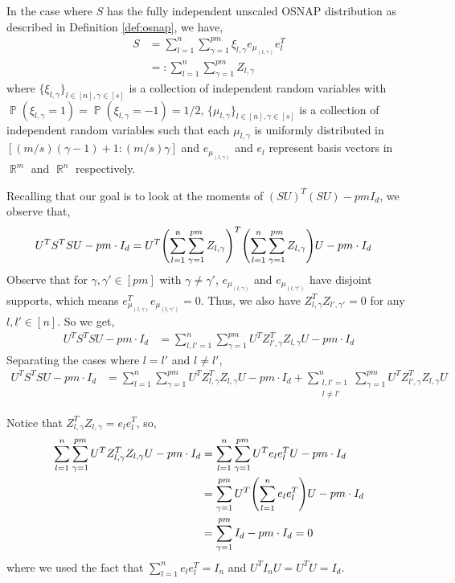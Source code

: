 \documentclass[11pt]{amsart}
\numberwithin{equation}{section}
\numberwithin{equation}{section}
\DeclareMathOperator{\R}{\mathbb{R}}
\DeclareMathOperator{\Pb}{\mathbb{P}}
\DeclarePairedDelimiter{\paren}{(}{)}
\begin{document}
In the case where $S$ has the fully independent unscaled OSNAP distribution as described in Definition \ref{def:osnap}, we have, 
\begin{align*}
    S &= \sum_{l=1}^n \sum_{\gamma=1}^{pm} \xi_{l,\gamma} e_{\mu_{(l, \gamma)}} e_l ^T \\
    &=: \sum_{l=1}^n \sum_{\gamma=1}^{pm} Z_{l,\gamma} 
\end{align*}
where $\{ \xi_{l,\gamma} \}_{l \in [n], \gamma \in [s]}$ is a collection of  independent random variables with $\Pb(\xi_{l,\gamma}=1)=\Pb(\xi_{l,\gamma}=-1)=1/2$, $\{ \mu_{l,\gamma} \}_{l \in [n], \gamma \in [s]}$ is a collection of  independent random variables such that each $\mu_{l,\gamma}$ is uniformly distributed in $[(m/s)(\gamma-1)+1:(m/s)\gamma]$ and $e_{\mu_{(l, \gamma)}}$ and $e_l$ represent basis vectors in $\R^m$ and $\R^n$ respectively. 

Recalling that our goal is to look at the moments of $(SU)^T(SU) - pm I_d$, we observe that,
\begin{align*}
    U^TS^TSU - pm\cdot I_d &= U^T \paren*{ \sum_{l=1}^n \sum_{\gamma=1}^{pm} Z_{l,\gamma} }^T \paren*{ \sum_{l=1}^n \sum_{\gamma=1}^{pm} Z_{l,\gamma} } U - pm\cdot I_d
\end{align*}
Observe that for $\gamma, \gamma' \in [pm]$ with $\gamma \neq \gamma'$, $e_{\mu_{(l, \gamma)}}$ and $e_{\mu_{(l, \gamma')}}$ have disjoint supports, which means $e_{\mu_{(l, \gamma)}}^T e_{\mu_{(l, \gamma')}} = 0$. Thus, we also have $Z_{l,\gamma}^T Z_{l',\gamma'} = 0$ for any $l, l' \in [n]$. So we get,
\begin{align*}
    U^TS^TSU - pm\cdot I_d &= \sum_{l, l'=1}^n \sum_{\gamma=1}^{pm} U^T Z_{l',\gamma} ^T Z_{l,\gamma}  U - pm\cdot I_d
\end{align*}
Separating the cases where $l=l'$ and $l \neq l'$,
\begin{equation}\label{eq:diagoffdiag}
    \begin{aligned}
    U^TS^TSU - pm\cdot I_d &= \sum_{l=1}^n \sum_{\gamma=1}^{pm} U^T Z_{l,\gamma} ^T Z_{l,\gamma}  U - pm\cdot I_d + \sum_{\substack{l, l'=1 \\ l\neq l'}}^n \sum_{\gamma=1}^{pm} U^T Z_{l',\gamma} ^T Z_{l,\gamma}  U 
\end{aligned}
\end{equation}

Notice that $Z_{l,\gamma} ^T Z_{l,\gamma} = e_l e_l^T$, so,
\begin{align*}
    \sum_{l=1}^n \sum_{\gamma=1}^{pm} U^T Z_{l,\gamma} ^T Z_{l,\gamma}  U - pm\cdot I_d &= \sum_{l=1}^n \sum_{\gamma=1}^{pm} U^T e_l e_l^T  U - pm\cdot I_d \\
    &= \sum_{\gamma=1}^{pm} U^T \paren*{ \sum_{l=1}^n e_l e_l^T}  U - pm\cdot I_d \\
    &= \sum_{\gamma=1}^{pm} I_d - pm\cdot I_d = 0\\
\end{align*}
where we used the fact that $\sum_{l=1}^n e_l e_l^T = I_n$ and $U^T I_n U = U^TU = I_d$.
\end{document}
